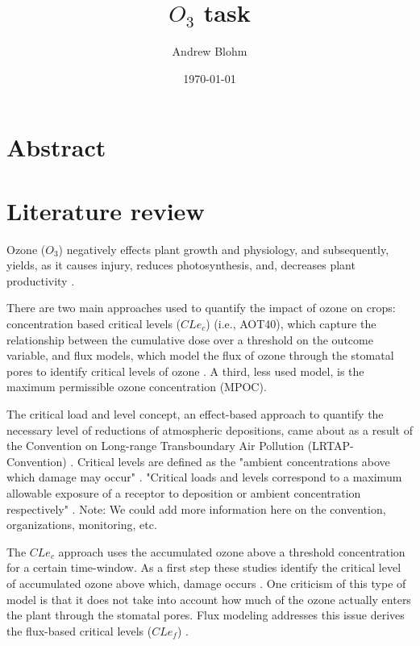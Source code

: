 \documentclass[10pt]{amsart}
\title{$O_{3}$ task}
\author{Andrew Blohm}
\date{\today}
\begin{document}
\maketitle

\section{Abstract}

\section{Literature review}
Ozone ($O_{3}$) negatively effects plant growth and physiology, and subsequently, yields, as it causes injury, reduces photosynthesis, and, decreases plant productivity \parencite{mishra:2013aa}. 

There are two main approaches used to quantify the impact of ozone on crops: concentration based critical levels ($CLe_{c}$) (i.e., AOT40), which capture the relationship between the cumulative dose over a threshold on the outcome variable, and flux models, which model the flux of ozone through the stomatal pores to identify critical levels of ozone \parencite{mills:2007aa}. 
A third, less used model, is the maximum permissible ozone concentration (MPOC)\parencite{mills:2007aa}.  

The critical load and level concept, an effect-based approach to quantify the necessary level of reductions of atmospheric depositions, came about as a result of the Convention on Long-range Transboundary Air Pollution (LRTAP-Convention) \parencite{clrtap:2015aa}. 
Critical levels are defined as the "ambient concentrations above which damage may occur" \parencite[I-5]{clrtap:2015aa}.
"Critical loads and levels correspond to a maximum allowable exposure of a receptor to deposition or ambient concentration respectively" \parencite[I-5]{clrtap:2015aa}.
Note: We could add more information here on the convention, organizations, monitoring, etc. 

The $CLe_{c}$ approach uses the accumulated ozone above a threshold concentration for a certain time-window. 
As a first step these studies identify the critical level of accumulated ozone above which, damage occurs \parencite{mills:2007aa}.
One criticism of this type of model is that it does not take into account how much of the ozone actually enters the plant through the stomatal pores.
Flux modeling addresses this issue derives the flux-based critical levels ($CLe_{f}$) \parencite{mills:2007aa}.  
\end{document}
